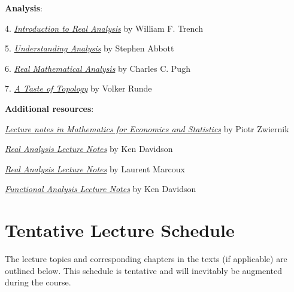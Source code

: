 \documentclass[12pt]{article}
\begin{document}
\vspace{1em}

\noindent
{\bf{Analysis}}:
\vspace{0.1cm}

4. \href{https://digitalcommons.trinity.edu/mono/7/}{{\emph{Introduction to Real Analysis}}} by William F. Trench

5. \href{https://link-springer-com.myaccess.library.utoronto.ca/book/10.1007/978-1-4939-2712-8}{{\emph{Understanding Analysis}}} by Stephen Abbott

6. \href{https://link-springer-com.myaccess.library.utoronto.ca/book/10.1007/978-3-319-17771-7}{\emph{Real Mathematical Analysis}} by Charles C. Pugh

7. \href{https://link-springer-com.myaccess.library.utoronto.ca/book/10.1007/0-387-28387-0}{\emph{A Taste of Topology}} by Volker Runde


\vspace{1em}

\noindent
{\bf{Additional resources}}:
\vspace{0.1cm}

\href{http://84.89.132.1/~piotr/docs/RealAnalysisNotes.pdf}{\emph{Lecture notes in Mathematics for Economics and Statistics}} by Piotr Zwiernik

\href{http://www.math.uwaterloo.ca/~krdavids/PM351/PMath351Notes.pdf}{{\emph{Real Analysis Lecture Notes}}} by Ken Davidson

\href{http://www.math.uwaterloo.ca/~lwmarcou/notes/pmath351.pdf}{{\emph{Real Analysis Lecture Notes}}} by Laurent Marcoux

\href{http://www.math.uwaterloo.ca/~krdavids/FA/PM453Notes.pdf}{{\emph{Functional Analysis Lecture Notes}}} by Ken Davidson




\section{Tentative Lecture Schedule}
The lecture topics and corresponding chapters in the texts (if applicable) are outlined below.  This schedule is tentative and will inevitably be augmented during the course.  
\end{document}

